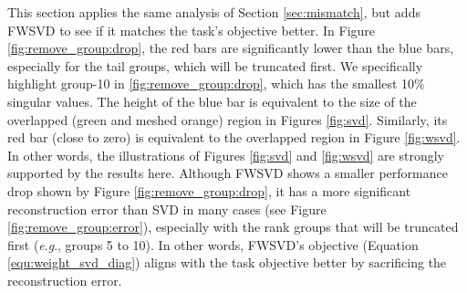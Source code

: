 \documentclass{article} %
\newcommand{\eg}{\textit{e}.\textit{g}.}
\begin{document}
This section applies the same analysis of Section \ref{sec:mismatch}, but adds FWSVD to see if it matches the task's objective better. In Figure \ref{fig:remove_group:drop}, the red bars are significantly lower than the blue bars, especially for the tail groups, which will be truncated first.
We specifically highlight group-10 in \ref{fig:remove_group:drop}, which has the smallest 10\% singular values. The height of the blue bar is equivalent to the size of the overlapped (green and meshed orange) region in Figures \ref{fig:svd}. Similarly, its red bar (close to zero) is equivalent to the overlapped region in Figure \ref{fig:wsvd}. In other words, the illustrations of Figures \ref{fig:svd} and \ref{fig:wsvd} are strongly supported by the results here. Although FWSVD shows a smaller performance drop shown by Figure \ref{fig:remove_group:drop}, it has a more significant reconstruction error than SVD in many cases (see Figure \ref{fig:remove_group:error}), especially with the rank groups that will be truncated first (\eg, groups 5 to 10). In other words, FWSVD's objective (Equation \ref{equ:weight_svd_diag}) aligns with the task objective better by sacrificing the reconstruction error.




\end{document}
